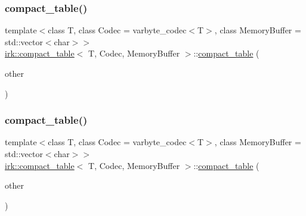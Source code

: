 \mbox{\label{classirk_1_1compact__table_acdd943c6ec8da8017909598b2e6a4032}} 
\subsubsection{\texorpdfstring{compact\+\_\+table()}{compact\_table()}\hspace{0.1cm}{\footnotesize\ttfamily [2/3]}}
{\footnotesize\ttfamily template$<$class T, class Codec = varbyte\+\_\+codec$<$\+T$>$, class Memory\+Buffer = std\+::vector$<$char$>$$>$ \\
\mbox{\hyperlink{classirk_1_1compact__table}{irk\+::compact\+\_\+table}}$<$ T, Codec, Memory\+Buffer $>$\+::\mbox{\hyperlink{classirk_1_1compact__table}{compact\+\_\+table}} (\begin{DoxyParamCaption}\item[{\mbox{\hyperlink{classirk_1_1compact__table}{compact\+\_\+table}}$<$ T, Codec, Memory\+Buffer $>$ \&\&}]{other }\end{DoxyParamCaption})\hspace{0.3cm}{\ttfamily [inline]}}

\mbox{\label{classirk_1_1compact__table_ac598641b6433f4912de02fd830dcdaa6}} 
\subsubsection{\texorpdfstring{compact\+\_\+table()}{compact\_table()}\hspace{0.1cm}{\footnotesize\ttfamily [3/3]}}
{\footnotesize\ttfamily template$<$class T, class Codec = varbyte\+\_\+codec$<$\+T$>$, class Memory\+Buffer = std\+::vector$<$char$>$$>$ \\
\mbox{\hyperlink{classirk_1_1compact__table}{irk\+::compact\+\_\+table}}$<$ T, Codec, Memory\+Buffer $>$\+::\mbox{\hyperlink{classirk_1_1compact__table}{compact\+\_\+table}} (\begin{DoxyParamCaption}\item[{const \mbox{\hyperlink{classirk_1_1compact__table}{compact\+\_\+table}}$<$ T, Codec, Memory\+Buffer $>$ \&}]{other }\end{DoxyParamCaption})\hspace{0.3cm}{\ttfamily [inline]}}



